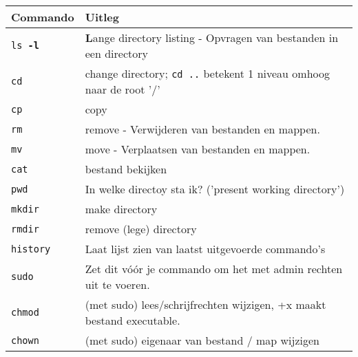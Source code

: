 \begin{table}[ht] %
	\begin{tabular}{|l|l|}
		\hline
		Commando & Uitleg \\ \hline
		\texttt{ls \textbf{-l}} & \textbf{L}ange directory listing - Opvragen van bestanden in een directory  \\ \hline
		\texttt{cd} & change directory; \texttt{cd ..} betekent 1 niveau omhoog naar de root '/' \\ \hline
	    \texttt{cp} & copy \\ \hline
	    \texttt{rm} & remove - Verwijderen van bestanden en mappen. \\ \hline
	    \texttt{mv} & move - Verplaatsen van bestanden en mappen. \\ \hline
	    \texttt{cat} & bestand bekijken \\ \hline
	    \texttt{pwd} & In welke directoy sta ik? ('present working directory') \\ \hline
	    \texttt{mkdir} & make directory \\ \hline
		\texttt{rmdir} & remove (lege) directory \\ \hline
	    \texttt{history} & Laat lijst zien van laatst uitgevoerde commando's \\ \hline
	    \texttt{sudo} & Zet dit vóór je commando om het met admin rechten uit te voeren. \\ \hline
	    \texttt{chmod} & (met sudo) lees/schrijfrechten wijzigen, +x maakt bestand executable. \\ \hline
	    \texttt{chown} & (met sudo) eigenaar van bestand / map wijzigen \\ \hline
	\end{tabular}
\end{table}

\break
